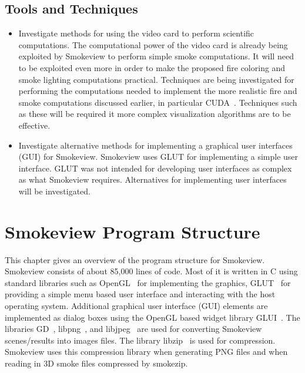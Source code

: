 \documentclass[11pt,twoside]{book}
\begin{document}
\section{Tools and Techniques}

\begin{itemize}

\item Investigate methods for using the video card to perform scientific computations.
The computational power of the video card is already  being exploited by Smokeview to perform simple smoke computations.
It will need to be exploited even more in order to make the proposed fire coloring and smoke lighting computations practical.
Techniques are being investigated for performing the computations needed to implement the more realistic fire and smoke computations discussed earlier, in particular CUDA~\cite{CUDA}.  Techniques such as these will be required it more complex visualization algorithms are to be effective.

\item Investigate alternative methods for implementing a graphical user interfaces (GUI) for Smokeview. Smokeview uses GLUT for implementing a simple user interface.  GLUT was not intended for developing user interfaces as complex as what Smokeview requires.  Alternatives for implementing user interfaces will be investigated.

\end{itemize}

%
%




%
%

\appendix
{}


%
%

\chapter{Smokeview Program Structure}
\label{smvprogstruct}

This chapter gives an overview of the program structure for Smokeview.
Smokeview consists of about 85,000 lines of code.  Most of it is
written in C using standard libraries such as
OpenGL~\cite{OpenGLRed} for implementing the graphics, GLUT~\cite{OpenGLGlut} for providing a
simple menu based user interface and interacting with the host operating system.
Additional graphical user interface (GUI) elements are implemented as dialog boxes using the
OpenGL based widget library GLUI~\cite{GLUILIB}.
The libraries GD~\cite{GDLIB}, libpng~\cite{PNGLIB},
and libjpeg~\cite{JPEGLIB} are used for converting Smokeview scenes/results into images files.
The library
libzip~\cite{ZLIB} is used for compression.
Smokeview uses this compression library when generating PNG files and when reading in 3D smoke files compressed by smokezip.
\end{document}
